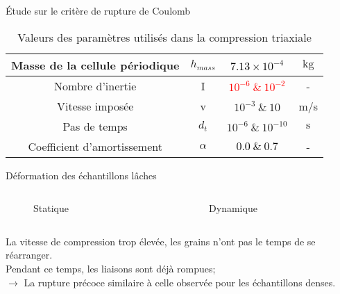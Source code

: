 \documentclass[10pt]{beamer}
\begin{document}
\begin{frame}{Étude sur le critère de rupture de Coulomb}
\begin{table}
\begin{tabular}{|c|c|c|c|}
            \hline
            Masse de la cellule périodique  & $h_{mass}$                  & \textcolor{black}{$7.13 \times 10^{-4}$}  & $\text{kg}$     \\
            \hline
            Nombre d’inertie                & I                           & \textcolor{red}{$10^{-6}\  \& \ 10^{-2}$} & -               \\
            \hline
            Vitesse imposée                 & v                           & $10^{-3}\  \& \ 10 $                      & m/s             \\
            \hline
            Pas de temps                    & $d_t$                       & $10^{-6}\  \& \ 10^{-10}$                 & $\text{s}$      \\
            \hline
            Coefficient d'amortissement     & $\alpha$                    & \textcolor{black}{$0.0 \ \& \ 0.7$}       & -               \\
            \hline
        \end{tabular}
        \caption{Valeurs des paramètres utilisés dans la compression triaxiale}
    \end{table}
\end{frame}




\begin{frame}{Déformation des échantillons lâches}
    \begin{columns}
        \begin{column}{0.5\textwidth}
            \begin{figure}[h]
                \centering
                \caption{Statique}
            \end{figure}
        \end{column}
        \begin{column}{0.5\textwidth}
            \begin{figure}[h]
                \centering
                \caption{Dynamique}
            \end{figure}
        \end{column}
    \end{columns}
    La vitesse de compression trop élevée, les grains n'ont pas le temps de se réarranger. \\
    Pendant ce temps, les liaisons sont déjà rompues; \\
    $\rightarrow$ La rupture précoce similaire à celle observée pour les échantillons denses.
\end{frame}
\end{document}
